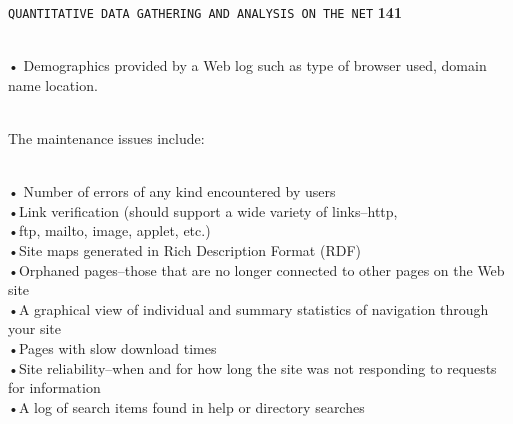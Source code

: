 \documentclass{book}
\begin{document}
\begin{flushright}
\texttt{QUANTITATIVE DATA GATHERING AND ANALYSIS ON THE NET}
\hspace*{0.5cm}
\textbf{141}
\end{flushright}
\vspace*{0.6cm}
\\\hspace*{0.5cm}• Demographics provided by a Web log such as type of browser used, domain name location.

\\\hspace*{0.5cm}The maintenance issues include:

\\\hspace*{0.5cm}• Number of errors of any kind encountered by users
\\\hspace*{0.5cm}•Link verification (should support a wide variety of links--http,
\\\hspace*{0.5cm}•ftp, mailto, image, applet, etc.)
\\\hspace*{0.5cm}•Site maps generated in Rich Description Format (RDF)
\\\hspace*{0.5cm}•Orphaned pages--those that are no longer connected to other pages on the Web site
\\\hspace*{0.5cm}•A graphical view of individual and summary statistics of navigation through your site
\\\hspace*{0.5cm}•Pages with slow download times
\\\hspace*{0.5cm}•Site reliability--when and for how long the site was not responding to requests for information
\\\hspace*{0.5cm}•A log of search items found in help or directory searches\\
\end{document}
